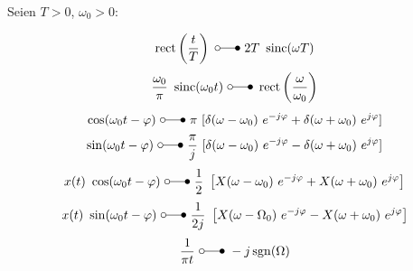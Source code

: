 \documentclass[a4paper, 11pt]{article}
\newcommand{\ftransform}{~\laplace~}
\DeclareMathOperator{\sinc}{sinc}
\DeclareMathOperator{\sgn}{sgn}
\DeclareMathOperator{\rect}{rect}
\begin{document}
Seien $T > 0$, $\omega_0 > 0$:
\begin{multicols}{2}
	\[ \rect \left(\frac{t}{T} \right) \ftransform 2 T ~ \sinc(\omega T) \]
	\[ \frac{\omega_0}{\pi} ~ \sinc(\omega_0 t) \ftransform \rect \left( \frac{\omega}{\omega_0} \right) \]
	\[ \cos(\omega_0 t - \varphi) \ftransform \pi ~ [\delta(\omega - \omega_0) ~ e^{-j \varphi} + \delta(\omega + \omega_0) ~ e^{j \varphi}] \]
	\[ \sin(\omega_0 t - \varphi) \ftransform \frac{\pi}{j} ~ [\delta(\omega - \omega_0) ~ e^{-j \varphi} - \delta(\omega + \omega_0) ~ e^{j \varphi}] \]
	\[ x(t) ~ \cos(\omega_0 t - \varphi) \ftransform \frac{1}{2} ~ \left[X(\omega - \omega_0) ~ e^{-j \varphi} + X(\omega + \omega_0) ~ e^{j \varphi} \right]\]
	\[ x(t) ~ \sin(\omega_0 t - \varphi) \ftransform \frac{1}{2j} ~ \left[X(\omega - \Omega_0) ~ e^{-j \varphi} - X(\omega + \omega_0) ~ e^{j \varphi} \right]\]
	\[ \frac{1}{\pi t} \ftransform - j \sgn(\Omega)\]
\end{multicols}


\end{document}

